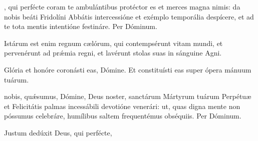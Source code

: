 \documentclass[fontsize=9pt,paper=A6,twoside,BCOR=1mm,DIV=22,headinclude]{scrarticle}
\renewcommand\A\Ant
\begin{document}
\begin{multicols}{2}
\Te


\VRCii 

\BC 

, qui perfécte coram te ambulántibus protéctor es et merces magna nimis: da nobis beáti Fridolíni Abbátis intercessióne et exémplo temporália despícere, et ad te tota mentis intentióne festináre. Per Dóminum.


\A Istárum est enim regnum cælórum, qui contempsérunt vitam mundi, et pervenérunt ad prǽmia regni, et lavérunt stolas suas in sánguine Agni.

\V Glória et honóre coronásti eas, Dómine.
\R Et constituísti eas super ópera mánuum tuárum.

 nobis, quǽsumus, Dómine, Deus noster, sanctárum Mártyrum tuárum Perpétuæ et Felicitátis palmas incessábili devotióne venerári: ut, quas digna mente non póssumus celebráre, humílibus saltem frequentémus obséquiis. \red{(}Per Dóminum.\red{)}



\AiiiC 

\V Justum dedúxit  Deus, qui perfécte, 



\end{multicols}

\ornamentvi
\end{document}
